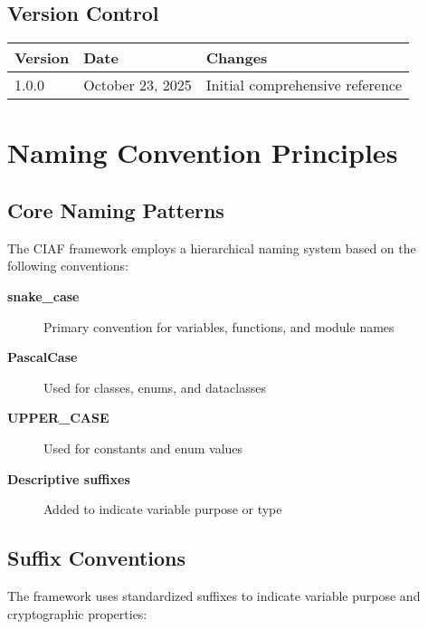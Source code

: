 \documentclass[12pt,a4paper]{article}
\begin{document}
\subsection{Version Control}

\begin{tabular}{@{}lll@{}}
\toprule
Version & Date & Changes \\
\midrule
1.0.0 & October 23, 2025 & Initial comprehensive reference \\
\bottomrule
\end{tabular}

\section{Naming Convention Principles}

\subsection{Core Naming Patterns}

The CIAF framework employs a hierarchical naming system based on the following conventions:

\begin{description}
\item[\textbf{snake\_case}] Primary convention for variables, functions, and module names
\item[\textbf{PascalCase}] Used for classes, enums, and dataclasses
\item[\textbf{UPPER\_CASE}] Used for constants and enum values
\item[\textbf{Descriptive suffixes}] Added to indicate variable purpose or type
\end{description}

\subsection{Suffix Conventions}

The framework uses standardized suffixes to indicate variable purpose and cryptographic properties:
\end{document}
